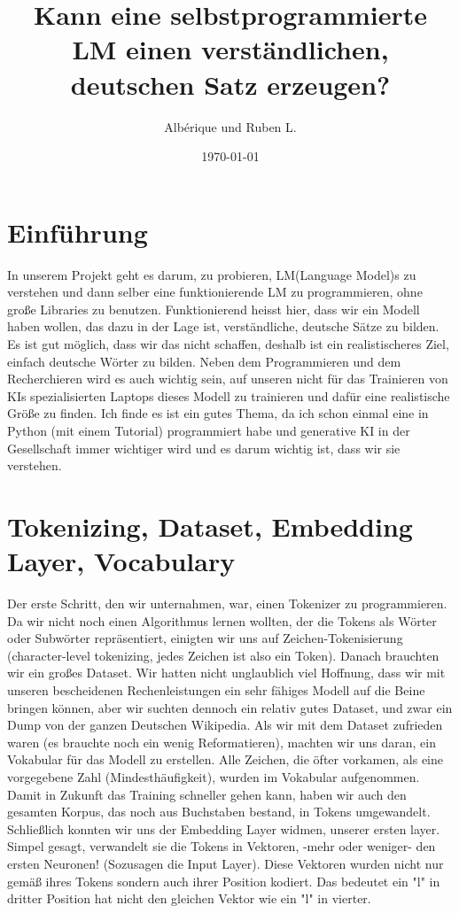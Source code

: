 \documentclass[12pt, letterpaper]{article}
\title{Kann eine selbstprogrammierte LM einen verständlichen, deutschen Satz erzeugen?}
\author{Albérique und Ruben L.}
\date{\today}
\begin{document}
\maketitle
\newpage
\section{Einführung}
In unserem Projekt geht es darum, zu probieren, LM(Language Model)s zu verstehen und dann selber eine funktionierende LM zu programmieren, ohne große Libraries zu benutzen. Funktionierend heisst hier, dass wir ein Modell haben wollen, das dazu in der Lage ist, verständliche, deutsche Sätze zu bilden. Es ist gut möglich, dass wir das nicht schaffen, deshalb ist ein realistischeres Ziel, einfach deutsche Wörter zu bilden. Neben dem Programmieren und dem Recherchieren wird es auch wichtig sein, auf unseren nicht für das Trainieren von KIs spezialisierten Laptops dieses Modell zu trainieren und dafür eine realistische Größe zu finden. Ich finde es ist ein gutes Thema, da ich schon einmal eine in Python (mit einem Tutorial) programmiert habe und generative KI in der Gesellschaft immer wichtiger wird und es darum wichtig ist, dass wir sie verstehen.
\section{Tokenizing, Dataset, Embedding Layer, Vocabulary}
Der erste Schritt, den wir unternahmen, war, einen Tokenizer zu programmieren. Da wir nicht noch einen Algorithmus lernen wollten, der die Tokens als Wörter oder Subwörter repräsentiert, einigten wir uns auf Zeichen-Tokenisierung (character-level tokenizing, jedes Zeichen ist also ein Token).
Danach brauchten wir ein großes Dataset. Wir hatten nicht unglaublich viel Hoffnung, dass wir mit unseren bescheidenen Rechenleistungen ein sehr fähiges Modell auf die Beine bringen können, aber wir suchten dennoch ein relativ gutes Dataset, und zwar ein Dump von der ganzen Deutschen Wikipedia.
Als wir mit dem Dataset zufrieden waren (es brauchte noch ein wenig Reformatieren), machten wir uns daran, ein Vokabular für das Modell zu erstellen. Alle Zeichen, die öfter vorkamen, als eine vorgegebene Zahl (Mindesthäufigkeit), wurden im Vokabular aufgenommen.
Damit in Zukunft das Training schneller gehen kann, haben wir auch den gesamten Korpus, das noch aus Buchstaben bestand, in Tokens umgewandelt. 
Schließlich konnten wir uns der Embedding Layer widmen, unserer ersten layer. Simpel gesagt, verwandelt sie die Tokens in Vektoren, -mehr oder weniger- den ersten Neuronen! (Sozusagen die Input Layer). Diese Vektoren wurden nicht nur gemäß ihres Tokens sondern auch ihrer Position kodiert. Das bedeutet ein "l" in dritter Position hat nicht den gleichen Vektor wie ein "l" in vierter. 
\end{document}
